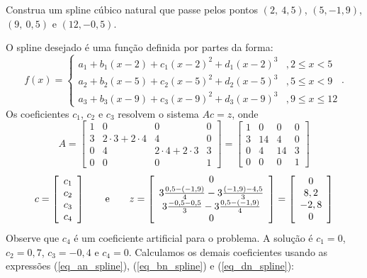 \begin{ex}Construa um spline cúbico natural que passe pelos pontos $(2,~4,5)$, $(5,-1,9)$, $(9,~0,5)$ e $(12,-0,5)$.
\end{ex}
\begin{sol}
O spline desejado é uma função definida por partes da forma:
\begin{equation}
f(x)=\left\{\begin{array}{ll}
a_1+b_1(x-2)+c_1(x-2)^2+d_1(x-2)^3 &, 2\leq x <5\\
a_2+b_2(x-5)+c_2(x-5)^2+d_2(x-5)^3 &, 5\leq x <9\\
a_3+b_3(x-9)+c_3(x-9)^2+d_3(x-9)^3 &, 9\leq x \leq 12
\end{array}\right..  
\end{equation}
Os coeficientes $c_1$, $c_2$ e $c_3$ resolvem o sistema $Ac = z$, onde
$$
A=\left[\begin{array}{cccc}
1 &0&0&0 \\
3&2\cdot 3+2\cdot 4&4&0\\
0&4&2\cdot 4+2\cdot 3&3\\
0&0&0&1
\end{array}\right]=\left[\begin{array}{cccc}
1 &0&0&0 \\
3&14&4&0\\
0&4&14&3\\
0&0&0&1
\end{array}\right]
$$
$$
c = \left[\begin{array}{c}
c_1\\
c_2\\
c_3\\
c_4
\end{array}\right]\qquad \hbox{e}\qquad
z=\left[\begin{array}{c}
0\\
3\frac{0,5-(-1,9)}{4}-3\frac{(-1,9)-4,5}{3}\\
3\frac{-0,5-0,5}{3}-3\frac{0,5-(-1,9)}{4}\\
0
\end{array}\right]=\left[\begin{array}{c}
0\\
8,2\\
-2,8\\
0
\end{array}\right]
$$
Observe que $c_4$ é um coeficiente artificial para o problema. A solução é  $c_1=0$, $c_2=0,7$, $c_3=-0,4$ e $c_4=0$. Calculamos os demais coeficientes usando as expressões (\ref{eq_an_spline}), (\ref{eq_bn_spline}) e (\ref{eq_dn_spline}):

\end{sol}
